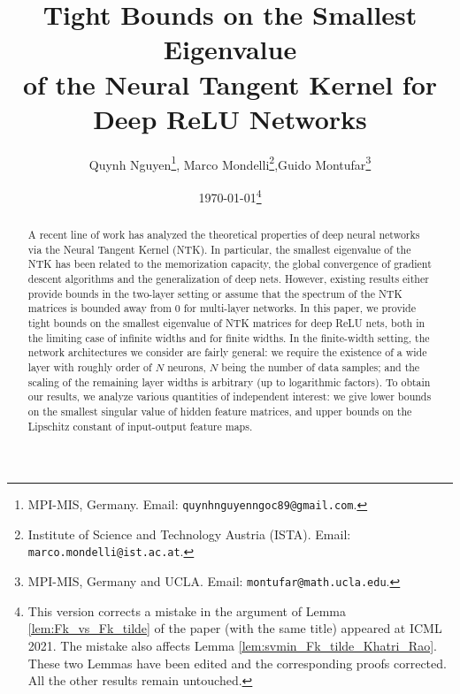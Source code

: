 \documentclass[11pt]{article}
\begin{document}
\title{Tight Bounds on the Smallest Eigenvalue \\of the Neural Tangent Kernel for Deep ReLU Networks}

\author{Quynh Nguyen\thanks{MPI-MIS, Germany. Email: \texttt{quynhnguyenngoc89@gmail.com}.}\;,
\;\;Marco Mondelli\thanks{Institute of Science and Technology Austria (ISTA). Email: \texttt{marco.mondelli@ist.ac.at}.}\;,\;\;Guido Montufar\thanks{MPI-MIS, Germany and UCLA. Email: \texttt{montufar@math.ucla.edu}.}}

\date{\today\thanks{This version corrects a mistake in the argument of Lemma \ref{lem:Fk_vs_Fk_tilde} of the paper (with the same title) appeared at ICML 2021. The mistake also affects Lemma \ref{lem:svmin_Fk_tilde_Khatri_Rao}. These two Lemmas have been edited and the corresponding proofs corrected. All the other results remain untouched.}}

\maketitle

\begin{abstract}
    A recent line of work has analyzed the theoretical properties of deep neural networks via the Neural Tangent Kernel (NTK). 
    In particular, the smallest eigenvalue of the NTK has been related to the memorization capacity, 
    the global convergence of gradient descent algorithms and the generalization of deep nets. 
    However, existing results either provide bounds in the two-layer setting or assume that the spectrum of the NTK matrices
    is bounded away from 0 for multi-layer networks. 
    In this paper, we provide tight bounds on the smallest eigenvalue of NTK matrices for deep ReLU nets, 
    both in the limiting case of infinite widths and for finite widths. 
    In the finite-width setting, the network architectures we consider are fairly general:
    we require the existence of a wide layer with roughly order of $N$ neurons, 
    $N$ being the number of data samples; and the scaling of the remaining layer widths is arbitrary (up to logarithmic factors). 
    To obtain our results, we analyze various quantities of independent interest: 
    we give lower bounds on the smallest singular value of hidden feature matrices, 
    and upper bounds on the Lipschitz constant of input-output feature maps.
\end{abstract}
\end{document}
